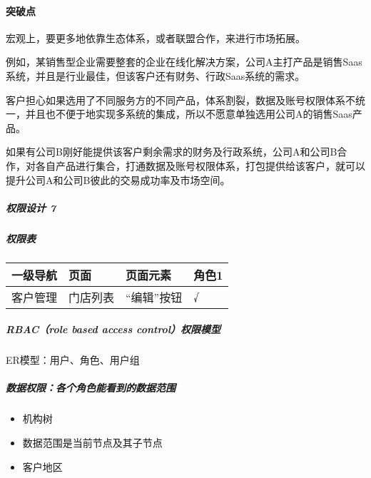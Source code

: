 \documentclass[letterpaper,10pt,english]{sphinxmanual}
\begin{document}
\paragraph{突破点}
\label{\detokenize{chapter_introduction/2B:id14}}
宏观上，要更多地依靠生态体系，或者联盟合作，来进行市场拓展。

例如，某销售型企业需要整套的企业在线化解决方案，公司A主打产品是销售Saas系统，并且是行业最佳，但该客户还有财务、行政Saas系统的需求。

客户担心如果选用了不同服务方的不同产品，体系割裂，数据及账号权限体系不统一，并且也不便于地实现多系统的集成，所以不愿意单独选用公司A的销售Saas产品。

如果有公司B刚好能提供该客户剩余需求的财务及行政系统，公司A和公司B合作，对各自产品进行集合，打通数据及账号权限体系，打包提供给该客户，就可以提升公司A和公司B彼此的交易成功率及市场空间。


\subparagraph{权限设计 7\sphinxfootnotemark[79]}
\label{\detokenize{chapter_introduction/2B:id15}}%
\begin{footnotetext}[79]\sphinxAtStartFootnote
{}
%
\end{footnotetext}\ignorespaces 

\subparagraph{权限表}
\label{\detokenize{chapter_introduction/2B:id16}}

\begin{savenotes}\sphinxattablestart
\centering
\begin{tabulary}{\linewidth}[t]{|T|T|T|T|}
\hline
\sphinxstyletheadfamily 
一级导航
&\sphinxstyletheadfamily 
页面
&\sphinxstyletheadfamily 
页面元素
&\sphinxstyletheadfamily 
角色1
\\
\hline
客户管理
&
门店列表
&
“编辑”按钮
&
√
\\
\hline
\end{tabulary}
\par
\sphinxattableend\end{savenotes}


\subparagraph{RBAC（role based access control）权限模型}
\label{\detokenize{chapter_introduction/2B:rbac-role-based-access-control}}
ER模型：用户、角色、用户组


\subparagraph{数据权限：各个角色能看到的数据范围}
\label{\detokenize{chapter_introduction/2B:id17}}\begin{itemize}
\item {} 
机构树

\item {} 
数据范围是当前节点及其子节点

\item {} 
客户地区

\end{itemize}
\end{document}

